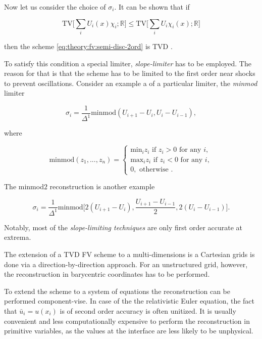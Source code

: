 Now let us consider the choice of $\sigma_i$. 
It can be shown that if 

\begin{equation}
\text{TV}\Bigg[\sum_{i}U_{i}(x)\chi_{i};\mathbb{R}\Bigg] \leq \text{TV}\Bigg[\sum_{i}U_{i}\chi_{i}(x);\mathbb{R}\Bigg]
\end{equation}

then the scheme \ref{eq:theory:fv:semi-disc-2ord} is TVD \cite{LeVeque:1992}. 

To satisfy this condition a special limiter, \textit{slope-limiter} has to be employed. 
The reason for that is that the scheme has to be limited to the first order near shocks to prevent oscillations. 
Consider an example a of a particular limiter, the \textit{minmod} limiter

\begin{equation}
\sigma_i = \frac{1}{\Delta^1}\text{minmod}(U_{i+1} - U_{i}, U_{i}-U_{i-1}),
\end{equation}

where

\begin{equation}
\text{minmod}(z_1,...,z_n) = 
\begin{cases}
\text{min}_i z_i \text{ if } z_i > 0 \text{ for any } i, \\
\text{max}_i z_i \text{ if } z_i < 0 \text{ for any } i, \\
0,  \text{               otherwise }.
\end{cases}
\end{equation}

The minmod$2$ reconstruction is another example 

\begin{equation}
\sigma_i = \frac{1}{\Delta^1}\text{minmod}\Big[2(U_{i+1} - U_i), \frac{U_{i+1} - U_{i-1}}{2}, 2(U_i - U_{i-1})\Big].
\end{equation}

Notably, most of the \textit{slope-limiting techniques} are only first order accurate at extrema. 

The extension of a TVD FV scheme to a multi-dimensions is a Cartesian grids is done via a direction-by-direction approach. For an unstructured grid, however, the reconstruction in barycentric coordinates has to be performed. 

To extend the scheme to a system of equations the reconstruction can be performed component-vise. 
In case of the the relativistic Euler equation, the fact that $\bar{u}_i = u(x_i)$ is of second order accuracy is often unitized. 
It is usually convenient and less computationally expensive to perform the reconstruction in primitive variables, as the values at the interface are less likely to be unphysical. 

